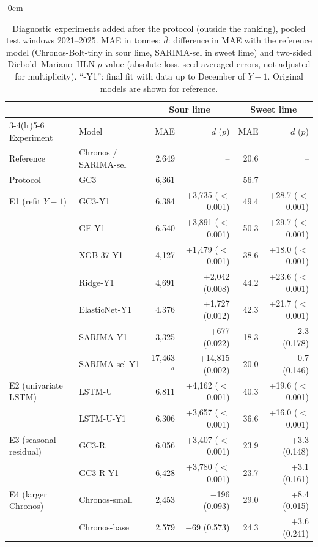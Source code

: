 \begin{table}[htbp]
\caption{Diagnostic experiments added after the protocol (outside the ranking), pooled test windows 2021--2025. MAE in tonnes; $\bar d$: difference in MAE with the reference model (Chronos-Bolt-tiny in sour lime, SARIMA-sel in sweet lime) and two-sided Diebold--Mariano--HLN $p$-value (absolute loss, seed-averaged errors, not adjusted for multiplicity). ``-Y1'': final fit with data up to December of $Y-1$. Original models are shown for reference.\label{tab:diag_experiments}}
\begin{adjustwidth}{-\extralength}{0cm}
\centering
\footnotesize
\setlength{\tabcolsep}{5pt}
\begin{tabular}{llrrrr}
\toprule
 & & \multicolumn{2}{c}{Sour lime} & \multicolumn{2}{c}{Sweet lime}\\
\cmidrule(lr){3-4}\cmidrule(lr){5-6}
Experiment & Model & MAE & $\bar d$ ($p$) & MAE & $\bar d$ ($p$)\\
\midrule
Reference & Chronos / SARIMA-sel & 2,649 & -- & 20.6 & --\\
Protocol & GC3 & 6,361 & & 56.7 & \\
\addlinespace
E1 (refit $Y-1$) & GC3-Y1 & 6,384 & +3,735 ($<$0.001) & 49.4 & +28.7 ($<$0.001)\\
 & GE-Y1 & 6,540 & +3,891 ($<$0.001) & 50.3 & +29.7 ($<$0.001)\\
 & XGB-37-Y1 & 4,127 & +1,479 ($<$0.001) & 38.6 & +18.0 ($<$0.001)\\
 & Ridge-Y1 & 4,691 & +2,042 (0.008) & 44.2 & +23.6 ($<$0.001)\\
 & ElasticNet-Y1 & 4,376 & +1,727 (0.012) & 42.3 & +21.7 ($<$0.001)\\
 & SARIMA-Y1 & 3,325 & +677 (0.022) & 18.3 & $-$2.3 (0.178)\\
 & SARIMA-sel-Y1 & 17,463$^{a}$ & +14,815 (0.002) & 20.0 & $-$0.7 (0.146)\\
\addlinespace
E2 (univariate LSTM) & LSTM-U & 6,811 & +4,162 ($<$0.001) & 40.3 & +19.6 ($<$0.001)\\
 & LSTM-U-Y1 & 6,306 & +3,657 ($<$0.001) & 36.6 & +16.0 ($<$0.001)\\
\addlinespace
E3 (seasonal residual) & GC3-R & 6,056 & +3,407 ($<$0.001) & 23.9 & +3.3 (0.148)\\
 & GC3-R-Y1 & 6,428 & +3,780 ($<$0.001) & 23.7 & +3.1 (0.161)\\
\addlinespace
E4 (larger Chronos) & Chronos-small & 2,453 & $-$196 (0.093) & 29.0 & +8.4 (0.015)\\
 & Chronos-base & 2,579 & $-$69 (0.573) & 24.3 & +3.6 (0.241)\\
\bottomrule
\end{tabular}
\end{adjustwidth}
\end{table}
